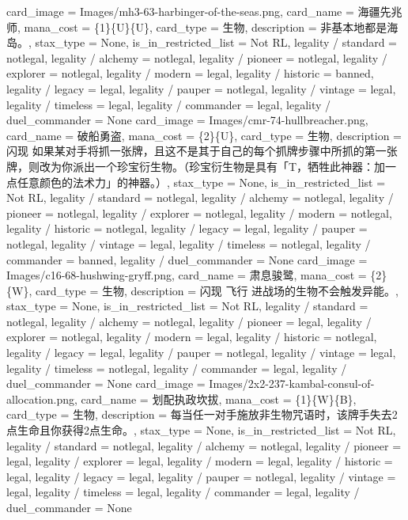 \documentclass[lang = cn, color = black, 10pt]{AllThatStax}
\begin{document}
\card
{
	card_image = Images/mh3-63-harbinger-of-the-seas.png,
	card_name = 海疆先兆师,
	mana_cost = \{1\}\{U\}\{U\},
	card_type = 生物,
	description = 非基本地都是海岛。,
	stax_type = None,
	is_in_restricted_list = Not RL,
	legality / standard = notlegal,
	legality / alchemy = notlegal,
	legality / pioneer = notlegal,
	legality / explorer = notlegal,
	legality / modern = legal,
	legality / historic = banned,
	legality / legacy = legal,
	legality / pauper = notlegal,
	legality / vintage = legal,
	legality / timeless = legal,
	legality / commander = legal,
	legality / duel_commander = None
}
\card
{
	card_image = Images/cmr-74-hullbreacher.png,
	card_name = 破船勇盗,
	mana_cost = \{2\}\{U\},
	card_type = 生物,
	description = 闪现
	如果某对手将抓一张牌，且这不是其于自己的每个抓牌步骤中所抓的第一张牌，则改为你派出一个珍宝衍生物。（珍宝衍生物是具有「{T}，牺牲此神器：加一点任意颜色的法术力」的神器。）,
	stax_type = None,
	is_in_restricted_list = Not RL,
	legality / standard = notlegal,
	legality / alchemy = notlegal,
	legality / pioneer = notlegal,
	legality / explorer = notlegal,
	legality / modern = notlegal,
	legality / historic = notlegal,
	legality / legacy = legal,
	legality / pauper = notlegal,
	legality / vintage = legal,
	legality / timeless = notlegal,
	legality / commander = banned,
	legality / duel_commander = None
}
\card
{
	card_image = Images/c16-68-hushwing-gryff.png,
	card_name = 肃息骏鹭,
	mana_cost = \{2\}\{W\},
	card_type = 生物,
	description = 闪现
	飞行
	进战场的生物不会触发异能。,
	stax_type = None,
	is_in_restricted_list = Not RL,
	legality / standard = notlegal,
	legality / alchemy = notlegal,
	legality / pioneer = legal,
	legality / explorer = notlegal,
	legality / modern = legal,
	legality / historic = notlegal,
	legality / legacy = legal,
	legality / pauper = notlegal,
	legality / vintage = legal,
	legality / timeless = notlegal,
	legality / commander = legal,
	legality / duel_commander = None
}
\card
{
	card_image = Images/2x2-237-kambal-consul-of-allocation.png,
	card_name = 划配执政坎拔,
	mana_cost = \{1\}\{W\}\{B\},
	card_type = 生物,
	description = 每当任一对手施放非生物咒语时，该牌手失去2点生命且你获得2点生命。,
	stax_type = None,
	is_in_restricted_list = Not RL,
	legality / standard = notlegal,
	legality / alchemy = notlegal,
	legality / pioneer = legal,
	legality / explorer = legal,
	legality / modern = legal,
	legality / historic = legal,
	legality / legacy = legal,
	legality / pauper = notlegal,
	legality / vintage = legal,
	legality / timeless = legal,
	legality / commander = legal,
	legality / duel_commander = None
}
\card
\end{document}
